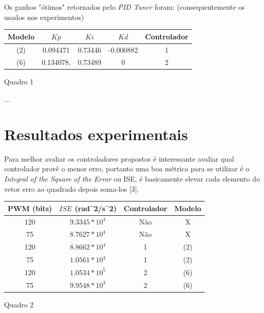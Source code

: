\documentclass{article}
\begin{document}
    Os ganhos "ótimos" retornados pelo \textit{PID Tuner} foram: (consequentemente os usados nos experimentos)
    \begin{center}
    \begin{tabular}{|c|c|c|c|c|}
            \hline
            Modelo & $Kp$ & $Ki$ & $Kd$ & Controlador \\
            \hline
            (2) & 0.094471 &  0.73446 & -0.000882 & 1 \\
            \hline
            (6) & 0.134078, & 0.73489 & 0 & 2 \\
            \hline
    \end{tabular}
    
  \caption{Quadro 1}
\end{center}
    
    
    
    \begin{table}
\begin{tabular}
...
\end{tabular}
\caption{\label{tab:table-name}Your caption.}
\end{table}

    
\section{Resultados experimentais}

Para melhor avaliar os controladores propostos é interessante avaliar qual controlador provê o menor erro, portanto uma boa métrica para se utilizar é o \textit{Integral of the Square of the Error} ou ISE, é basicamente elevar cada elemento do vetor erro ao quadrado depois soma-los [3].

\begin{center}
    \begin{tabular}{|c|c|c|c|}
            \hline
            PWM (bits) & $ISE$ (rad^2/s^2) & Controlador & Modelo \\
            \hline
            120 & $9.3345*10^4$ & Não & X \\
            \hline
            75 & $8.7627*10^4$ & Não & X \\
            \hline
            120 & $8.8662*10^4$ & 1 & (2) \\
            \hline
            75 & $1.0561*10^4$ & 1 & (2)\\
            \hline
            120 & $1.0534*10^5$ & 2 & (6) \\
            \hline
            75 & $9.9548*10^3$ & 2 & (6)\\
            \hline
    \end{tabular}
    
  \caption{Quadro 2}
\end{center}
\end{document}
